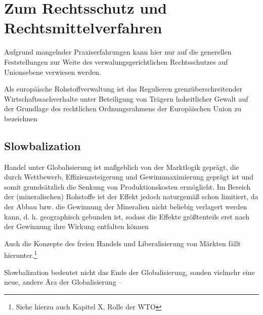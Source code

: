 \documentclass[12pt,a4paper,oneside]{book} %
\begin{document}
	\section{Zum Rechtsschutz und Rechtsmittelverfahren}
	
	Aufgrund mangelnder Praxiserfahrungen kann hier nur auf die generellen Feststellungen zur Weite des verwalungsgerichtlichen Rechtsschutzes auf Unionsebene verwiesen werden.
	
	
	\glqq Als europäische Rohstoffverwaltung ist das Regulieren grenzüberschreitender Wirtschaftssachverhalte unter Beteiligung von Trägern hoheitlicher Gewalt auf der Grundlage des rechtlichen Ordnungsrahmens der Europäischen Union zu bezeichnen\grqq \autocite{Schorkopf, Europäische Rohstoffverwaltung, Rn. 2}
	
	\subsection{Slowbalization}
	Handel unter Globalisierung ist maßgeblich von der Marktlogik geprägt, die durch Wettbewerb, Effizienzsteigerung und Gewinnmaximierung geprägt ist und somit grundsätzlich die Senkung von Produktionskosten ermöglicht. Im Bereich der (mineralischen) Rohstoffe ist der Effekt jedoch naturgemäß schon limitiert, da der Abbau bzw. die Gewinnung der Mineralien nicht beliebig verlagert werden kann, d. h. geographisch gebunden ist, sodass die Effekte größtenteils erst nach der Gewinnung ihre Wirkung entfalten können 
	
	Auch die Konzepte des freien Handels und Liberalisierung von Märkten fällt hierunter.\footnote{Siehe hierzu auch Kapitel X, Rolle der WTO}
	
	Slowbalization bedeutet nicht das Ende der Globalisierung, sonden vielmehr eine neue, andere Ära der Globalisierung -- 
	
\end{document}
